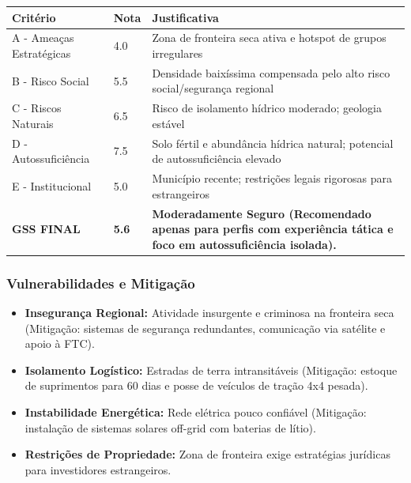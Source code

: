 \begin{table}[ht!]
\small \begin{tabular}{p{3.0cm}p{0.8cm}p{6.0cm}} \toprule
\textbf{Critério} & \textbf{Nota} & \textbf{Justificativa} \\ \midrule
A - Ameaças Estratégicas & 4.0 & Zona de fronteira seca ativa e hotspot de grupos irregulares \\
B - Risco Social & 5.5 & Densidade baixíssima compensada pelo alto risco social/\allowbreak \allowbreak segurança regional \\
C - Riscos Naturais & 6.5 & Risco de isolamento hídrico moderado; geologia estável \\
D - Autossuficiência & 7.5 & Solo fértil e abundância hídrica natural; potencial de autossuficiência elevado \\
E - Institucional & 5.0 & Município recente; restrições legais rigorosas para estrangeiros \\
\midrule \textbf{GSS FINAL} & \textbf{5.6} & \textbf{Moderadamente Seguro (Recomendado apenas para perfis com experiência tática e foco em autossuficiência isolada).} \\ \bottomrule \end{tabular}
\end{table}
\subsubsection{Vulnerabilidades e
Mitigação}

\begin{itemize}
\tightlist
\item
  \textbf{Insegurança Regional:} Atividade insurgente e criminosa na
  fronteira seca (Mitigação: sistemas de segurança redundantes,
  comunicação via satélite e apoio à FTC).
\item
  \textbf{Isolamento Logístico:} Estradas de terra intransitáveis
  (Mitigação: estoque de suprimentos para 60 dias e posse de veículos de
  tração 4x4 pesada).
\item
  \textbf{Instabilidade Energética:} Rede elétrica pouco confiável
  (Mitigação: instalação de sistemas solares off-grid com baterias de
  lítio).
\item
  \textbf{Restrições de Propriedade:} Zona de fronteira exige
  estratégias jurídicas para investidores estrangeiros.
\end{itemize}

